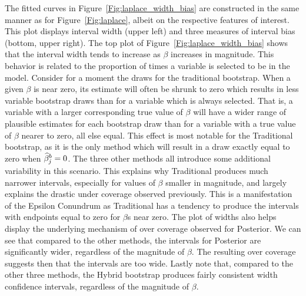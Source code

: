 The fitted curves in Figure~\ref{Fig:laplace_width_bias} are constructed in the same manner as for Figure~\ref{Fig:laplace}, albeit on the respective features of interest. This plot displays interval width (upper left) and three measures of interval bias (bottom, upper right). The top plot of Figure~\ref{Fig:laplace_width_bias} shows that the interval width tends to increase as $\beta$ increases in magnitude. This behavior is related to the proportion of times a variable is selected to be in the model. Consider for a moment the draws for the traditional bootstrap. When a given $\beta$ is near zero, its estimate will often be shrunk to zero which results in less variable bootstrap draws than for a variable which is always selected. That is, a variable with a larger corresponding true value of $\beta$ will have a wider range of plausible estimates for each bootstrap draw than for a variable with a true value of $\beta$ nearer to zero, all else equal. This effect is most notable for the Traditional bootstrap, as it is the only method which will result in a draw exactly equal to zero when $\widehat{\beta}^b_j = 0$. The three other methods all introduce some additional variability in this scenario. This explains why Traditional produces much narrower intervals, especially for values of $\beta$ smaller in magnitude, and largely explains the drastic under coverage observed previously. This is a manifestation of the Epsilon Conundrum as Traditional has a tendency to produce the intervals with endpoints equal to zero for $\beta$s near zero. The plot of widths also helps display the underlying mechanism of over coverage observed for Posterior. We can see that compared to the other methods, the intervals for Posterior are significantly wider, regardless of the magnitude of $\beta$. The resulting over coverage suggests then that the intervals are too wide. Lastly note that, compared to the other three methods, the Hybrid bootstrap produces fairly consistent width confidence intervals, regardless of the magnitude of $\beta$.


